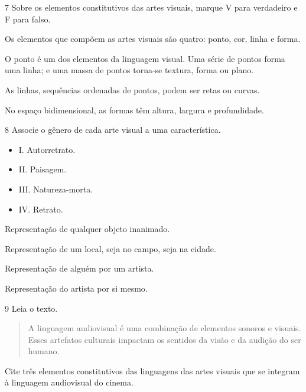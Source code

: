 \num{7} Sobre os elementos constitutivos das artes visuais, marque V para
verdadeiro e F para falso.

\begin{boxlist}
\item Os elementos que compõem as artes visuais são quatro: ponto, cor, linha e forma. 

\item O ponto é um dos elementos da linguagem visual. Uma série de pontos forma uma linha; e uma massa de pontos torna-se textura, forma ou plano. 

\item As linhas, sequências ordenadas de pontos, podem ser retas ou curvas. 

\item No espaço bidimensional, as formas têm altura, largura e profundidade. 
\end{boxlist}

\num{8} Associe o gênero de cada arte visual a uma característica.

\begin{itemize}
  \item I. Autorretrato.
  \item II. Paisagem.
  \item III. Natureza-morta.
  \item IV. Retrato.
\end{itemize}

\begin{escolha}
  \item Representação de qualquer objeto inanimado. 
  \item Representação de um local, seja no campo, seja na cidade. 
  \item Representação de alguém por um artista. 
  \item Representação do artista por si mesmo. 
\end{escolha}

\num{9} Leia o texto.

\begin{quote}
A linguagem audiovisual é uma combinação de elementos sonoros e visuais. Esses artefatos culturais impactam os sentidos da visão e da audição do ser humano.

\end{quote}

Cite três elementos constitutivos das linguagens das artes visuais que
se integram à linguagem audiovisual do cinema.

